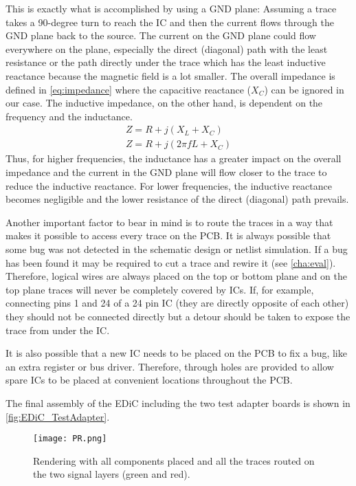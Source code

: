 This is exactly what is accomplished by using a GND plane:
Assuming a trace takes a 90-degree turn to reach the \gls{IC} and then the current flows through the GND plane back to the source.
The current on the GND plane could flow everywhere on the plane, especially the direct (diagonal) path with the least resistance or the path directly under the trace which has the least inductive reactance because the magnetic field is a lot smaller.
The overall impedance is defined in \cref{eq:impedance} where the capacitive reactance ($X_C$) can be ignored in our case.
The inductive impedance, on the other hand, is dependent on the frequency and the inductance. \cite[page 45]{Albach2011_2}
\begin{eqnarray}
  Z=R+j(X_L+X_C)\label{eq:impedance}\\
  Z=R+j(2\pi fL+X_C)
\end{eqnarray}
Thus, for higher frequencies, the inductance has a greater impact on the overall impedance and the current in the GND plane will flow closer to the trace to reduce the inductive reactance.
For lower frequencies, the inductive reactance becomes negligible and the lower resistance of the direct (diagonal) path prevails.

Another important factor to bear in mind is to route the traces in a way that makes it possible to access every trace on the \gls{PCB}.
It is always possible that some bug was not detected in the schematic design or netlist simulation.
If a bug has been found it may be required to cut a trace and rewire it (see \cref{cha:eval}).
Therefore, logical wires are always placed on the top or bottom plane and on the top plane traces will never be completely covered by \glspl{IC}.
If, for example, connecting pins 1 and 24 of a 24 pin \gls{IC} (they are directly opposite of each other) they should not be connected directly but a detour should be taken to expose the trace from under the \gls{IC}.

It is also possible that a new \gls{IC} needs to be placed on the \gls{PCB} to fix a bug, like an extra register or bus driver.
Therefore, through holes are provided to allow spare \glspl{IC} to be placed at convenient locations throughout the \gls{PCB}.

The final assembly of the \gls{EDiC} including the two test adapter boards is shown in \cref{fig:EDiC_TestAdapter}.

\begin{figure}[p]
  \centering
  \texttt{[image: PR.png]}
  \caption{Rendering with all components placed and all the traces routed on the two signal layers (green and red).}
  \label{fig:pr}
\end{figure}

